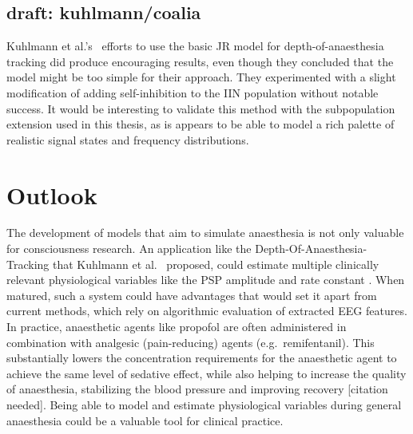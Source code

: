 \subsection{draft: kuhlmann/coalia}
Kuhlmann et al.'s~\cite{kuhlmann_neural_2016} efforts to use the basic JR model for depth-of-anaesthesia tracking did
produce encouraging results,
even though they concluded that the model might be too simple for their approach.
They experimented with a slight modification of adding self-inhibition to the IIN population without notable success.
It would be interesting to validate this method with the subpopulation extension used in this thesis,
as is appears to be able to model a rich palette of realistic signal states and frequency distributions.

\section{Outlook}

The development of models that aim to simulate anaesthesia is not only valuable for consciousness research.
An application like the Depth-Of-Anaesthesia-Tracking that Kuhlmann et al.~\cite{kuhlmann_neural_2016} proposed,
could estimate multiple clinically relevant physiological variables like the PSP amplitude and rate constant
.
When matured, such a system could have advantages that would set it apart from current methods,
which rely on algorithmic evaluation of extracted EEG features.
In practice, anaesthetic agents like propofol are often administered in combination with analgesic (pain-reducing)
agents (e.g.\ remifentanil).
This substantially lowers the concentration requirements for the anaesthetic agent to achieve the same level of
sedative effect,
while also helping to increase the quality of anaesthesia, stabilizing the blood pressure and improving recovery
[citation needed].
Being able to model and estimate physiological variables during general anaesthesia
could be a valuable tool for clinical practice.